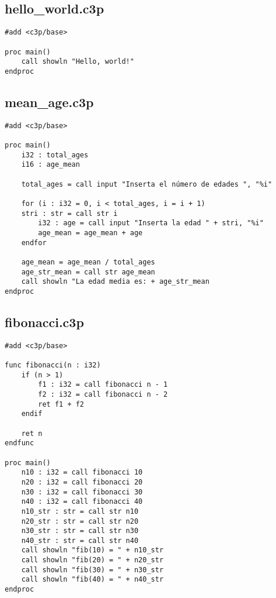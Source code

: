 \subsection{hello\_world.c3p}

\begin{verbatim}
#add <c3p/base>

proc main()
    call showln "Hello, world!"
endproc
\end{verbatim}

\subsection{mean\_age.c3p}
\begin{verbatim}
#add <c3p/base>

proc main()
    i32 : total_ages
    i16 : age_mean

    total_ages = call input "Inserta el número de edades ", "%i"

    for (i : i32 = 0, i < total_ages, i = i + 1)
	stri : str = call str i
        i32 : age = call input "Inserta la edad " + stri, "%i"
        age_mean = age_mean + age
    endfor

    age_mean = age_mean / total_ages
    age_str_mean = call str age_mean
    call showln "La edad media es: + age_str_mean
endproc
\end{verbatim}

\subsection{fibonacci.c3p}

\begin{verbatim}
#add <c3p/base>

func fibonacci(n : i32)
    if (n > 1)
        f1 : i32 = call fibonacci n - 1
        f2 : i32 = call fibonacci n - 2
        ret f1 + f2
    endif

    ret n
endfunc

proc main()
    n10 : i32 = call fibonacci 10
    n20 : i32 = call fibonacci 20
    n30 : i32 = call fibonacci 30
    n40 : i32 = call fibonacci 40
    n10_str : str = call str n10
    n20_str : str = call str n20
    n30_str : str = call str n30
    n40_str : str = call str n40
    call showln "fib(10) = " + n10_str
    call showln "fib(20) = " + n20_str
    call showln "fib(30) = " + n30_str
    call showln "fib(40) = " + n40_str
endproc
\end{verbatim}

